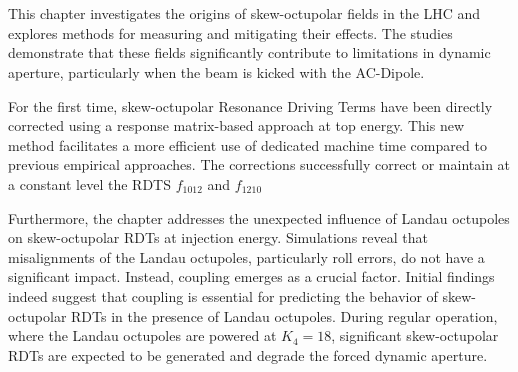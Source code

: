 

\FloatBarrier
\section{}

This chapter investigates the origins of skew-octupolar fields in the LHC and explores methods for
measuring and mitigating their effects. The studies demonstrate that these fields significantly
contribute to limitations in dynamic aperture, particularly when the beam is kicked with the
AC-Dipole. 

For the first time, skew-octupolar Resonance Driving Terms have been directly corrected using
a response matrix-based approach at top energy. This new method facilitates a more efficient use of
dedicated machine time compared to previous empirical approaches. The corrections successfully
correct or maintain at a constant level the RDTS $f_{1012}$ and $f_{1210}$

Furthermore, the chapter addresses the unexpected influence of Landau octupoles on skew-octupolar
RDTs at injection energy. Simulations reveal that misalignments of the Landau octupoles,
particularly roll errors, do not have a significant impact. Instead, coupling emerges as a crucial
factor.
Initial findings indeed suggest that coupling is essential for predicting the behavior of
skew-octupolar RDTs in the presence of Landau octupoles. During regular operation, where the Landau
octupoles are powered at $K_4 = 18$, significant skew-octupolar RDTs are expected to be generated
and degrade the forced dynamic aperture.

